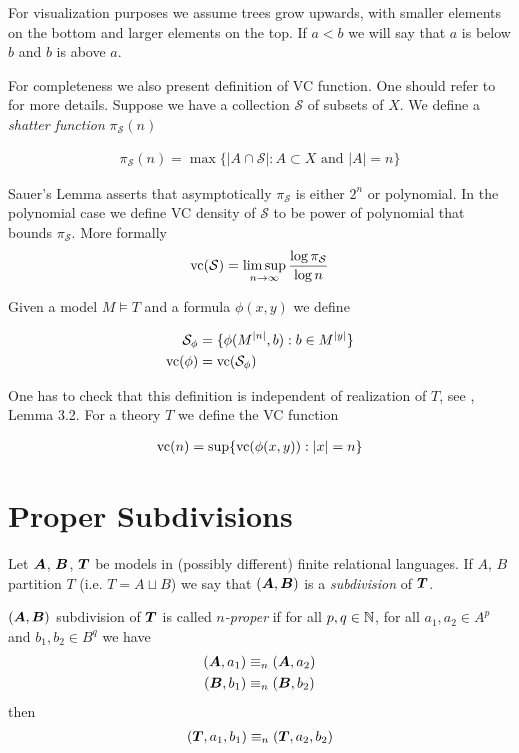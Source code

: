 \documentclass{amsart}
\DeclareMathOperator{\TT}{\boldface T}
\DeclareMathOperator{\A}{\boldface A}
\DeclareMathOperator{\B}{\boldface B}
\newcommand{\CS}{\mathcal S}
\begin{document}
For visualization purposes we assume trees grow upwards, with smaller elements on the bottom and larger elements on the top. If $a < b$ we will say that $a$ is below $b$ and $b$ is above $a$.

For completeness we also present definition of VC function.
One should refer to \cite{vc_density} for more details.
Suppose we have a collection $\CS$ of subsets of $X$. We define a \emph{shatter function} $\pi_\CS(n)$

\begin{align*}
	\pi_\CS(n) = \max \{|A \cap \CS| : A \subset X \text{ and } |A| = n\}
\end{align*}

Sauer's Lemma asserts that asymptotically $\pi_\CS$ is either $2^n$ or polynomial.
In the polynomial case we define VC density of $\CS$ to be power of polynomial that bounds $\pi_\CS$.
More formally 
\begin{align*}
	\vc(\CS) = \limsup_{n \to \infty}\frac{\log \pi_\CS}{\log n}
\end{align*}

Given a model $M \models T$ and a formula $\phi(x, y)$ we define 

\begin{align*}
	\CS_\phi &= \{\phi(M^{|n|}, b) : b \in M^{|y|}\} \\
	\vc(\phi) &=  \vc(\CS_\phi)
\end{align*}

One has to check that this definition is independent of realization of $T$, see \cite{vc_density}, Lemma 3.2. For a theory $T$ we define the VC function

\begin{align*}
	\operatorname{vc}(n) = \sup \{\operatorname{vc}(\phi(x, y)) : |x| = n\}
\end{align*}

\section{Proper Subdivisions}
\begin{Definition}
	Let $\A$, $\B$, $\TT$ be models in (possibly different) finite relational languages. If $A$, $B$ partition $T$ (i.e. $T = A \sqcup B$) we say that $(\A, \B)$ is a \emph{subdivision} of $\TT$.
\end{Definition}

\begin{Definition}
	$(\A, \B)$ subdivision of $\TT$ is called \emph{$n$-proper} if for all $p,q \in \mathbb{N}$, for all $a_1, a_2 \in A^p$ and $b_1, b_2 \in B^q$ we have
	\begin{align*}
		(\A, a_1) &\equiv_n (\A, a_2) \\
		(\B, b_1) &\equiv_n (\B, b_2)
	\end{align*}
	then
	\begin{align*}
		(\TT, a_1, b_1) \equiv_n (\TT, a_2, b_2)
	\end{align*}
\end{Definition}
\end{document}
